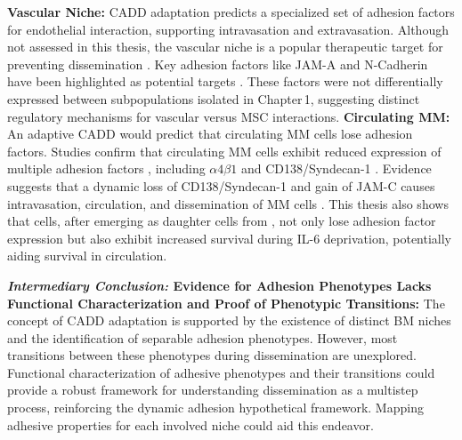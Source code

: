 \textbf{Vascular Niche:}
\ac{CADD} adaptation predicts a specialized set of adhesion factors for
endothelial interaction, supporting intravasation and extravasation. Although
not assessed in this thesis, the vascular niche is a popular therapeutic target
for preventing dissemination \cite{neriTargetingAdhesionMolecules2012}. Key
adhesion factors like JAM-A and N-Cadherin have been highlighted as potential
targets \cite{solimandoHaltingViciousCycle2020,
mrozikTherapeuticTargetingNcadherin2015}. These factors were not differentially
expressed between subpopulations isolated in Chapter\,1, suggesting distinct
regulatory mechanisms for vascular versus \ac{MSC} interactions. 
\textbf{Circulating MM:}
An adaptive \ac{CADD} would predict that circulating MM cells lose adhesion
factors. Studies confirm that  circulating
\ac{MM} cells exhibit reduced expression of multiple adhesion factors
, including
$\alpha4\beta1$ and CD138/Syndecan-1
\cite{paivaDetailedCharacterizationMultiple2013,
      paivaCompetitionClonalPlasma2011, akhmetzyanovaDynamicCD138Surface2020}.
Evidence suggests that a dynamic loss of CD138/Syndecan-1 and gain of JAM-C
causes intravasation, circulation, and dissemination of MM cells
\cite{akhmetzyanovaDynamicCD138Surface2020,
      brandlJunctionalAdhesionMolecule2022}. This thesis also shows that \nMAina
cells, after emerging as daughter cells from \MAina, not only lose adhesion
factor expression but also exhibit increased survival during IL-6 deprivation,
potentially aiding survival in circulation.


\textbf{\textit{Intermediary Conclusion:} Evidence for Adhesion Phenotypes Lacks Functional Characterization and Proof of Phenotypic Transitions:}
The concept of \ac{CADD} adaptation is supported by the existence of distinct BM
niches and the identification of separable adhesion phenotypes. However, most
transitions between these phenotypes during dissemination are unexplored.
Functional characterization of adhesive phenotypes and their transitions could
provide a robust framework for understanding dissemination as a multistep
process, reinforcing the dynamic adhesion hypothetical framework. Mapping
adhesive properties for each involved niche could aid this endeavor.



